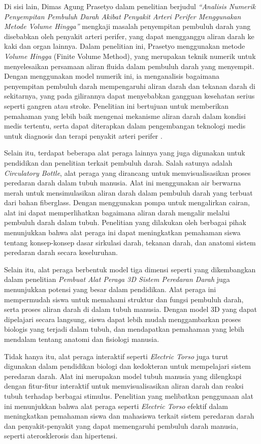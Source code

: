 Di sisi lain, Dimas Agung Prasetyo dalam penelitian berjudul \emph{“Analisis Numerik Penyempitan Pembuluh Darah Akibat Penyakit Arteri Perifer Menggunakan Metode Volume Hingga”} mengkaji masalah penyempitan pembuluh darah yang disebabkan oleh penyakit arteri perifer, yang dapat mengganggu aliran darah ke kaki dan organ lainnya. Dalam penelitian ini, Prasetyo menggunakan metode \emph{Volume Hingga} (Finite Volume Method), yang merupakan teknik numerik untuk menyelesaikan persamaan aliran fluida dalam pembuluh darah yang menyempit. Dengan menggunakan model numerik ini, ia menganalisis bagaimana penyempitan pembuluh darah mempengaruhi aliran darah dan tekanan darah di sekitarnya, yang pada gilirannya dapat menyebabkan gangguan kesehatan serius seperti gangren atau stroke. Penelitian ini bertujuan untuk memberikan pemahaman yang lebih baik mengenai mekanisme aliran darah dalam kondisi medis tertentu, serta dapat diterapkan dalam pengembangan teknologi medis untuk diagnosis dan terapi penyakit arteri perifer \cite{prasetyo2024analisis}.

Selain itu, terdapat beberapa alat peraga lainnya yang juga digunakan untuk pendidikan dan penelitian terkait pembuluh darah. Salah satunya adalah \emph{Circulatory Bottle}, alat peraga yang dirancang untuk memvisualisasikan proses peredaran darah dalam tubuh manusia. Alat ini menggunakan air berwarna merah untuk mensimulasikan aliran darah dalam pembuluh darah yang terbuat dari bahan fiberglass. Dengan menggunakan pompa untuk mengalirkan cairan, alat ini dapat memperlihatkan bagaimana aliran darah mengalir melalui pembuluh darah dalam tubuh. Penelitian yang dilakukan oleh berbagai pihak menunjukkan bahwa alat peraga ini dapat meningkatkan pemahaman siswa tentang konsep-konsep dasar sirkulasi darah, tekanan darah, dan anatomi sistem peredaran darah secara keseluruhan.

Selain itu, alat peraga berbentuk model tiga dimensi seperti yang dikembangkan dalam penelitian \emph{Pembuat Alat Peraga 3D Sistem Peredaran Darah} juga menunjukkan potensi yang besar dalam pendidikan. Alat peraga ini mempermudah siswa untuk memahami struktur dan fungsi pembuluh darah, serta proses aliran darah di dalam tubuh manusia. Dengan model 3D yang dapat dipelajari secara langsung, siswa dapat lebih mudah menggambarkan proses biologis yang terjadi dalam tubuh, dan mendapatkan pemahaman yang lebih mendalam tentang anatomi dan fisiologi manusia.

Tidak hanya itu, alat peraga interaktif seperti \emph{Electric Torso} juga turut digunakan dalam pendidikan biologi dan kedokteran untuk mempelajari sistem peredaran darah. Alat ini merupakan model tubuh manusia yang dilengkapi dengan fitur-fitur interaktif untuk memvisualisasikan aliran darah dan reaksi tubuh terhadap berbagai stimulus. Penelitian yang melibatkan penggunaan alat ini menunjukkan bahwa alat peraga seperti \emph{Electric Torso} efektif dalam meningkatkan pemahaman siswa dan mahasiswa terkait sistem peredaran darah dan penyakit-penyakit yang dapat memengaruhi pembuluh darah manusia, seperti aterosklerosis dan hipertensi.

